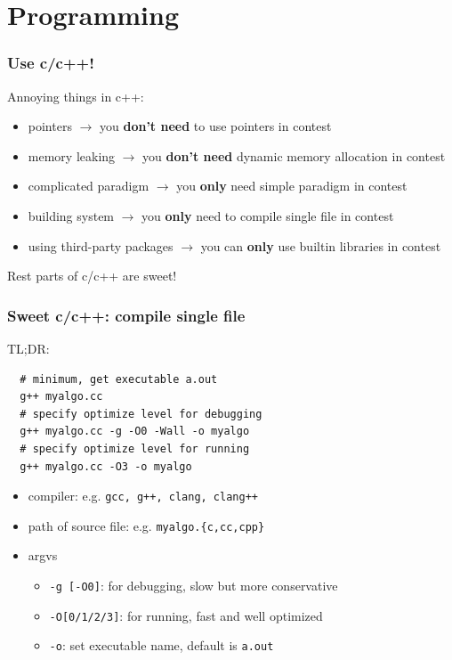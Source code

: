 \documentclass{beamer}
\begin{document}
\section{Programming}
\begin{frame}
  \frametitle{Use c/c++!}

Annoying things in c++:

\begin{itemize}
  \item {
    pointers
     {
      $\rightarrow$ you \textbf{don't need} to use pointers in contest
    }
  }
  \item {
    memory leaking
     {
      $\rightarrow$ you \textbf{don't need} dynamic memory allocation in contest
    }
  }
  \item {
    complicated paradigm
     {
      $\rightarrow$ you \textbf{only} need simple paradigm in contest
    }
  }
  \item {
    building system
     {
      $\rightarrow$ you \textbf{only} need to compile single file in contest
    }
  }
  \item {
    using third-party packages
     {
      $\rightarrow$ you can \textbf{only} use builtin libraries in contest
    }
  }
\end{itemize}
  
 {
  Rest parts of c/c++ are sweet!
}
\end{frame}

\begin{frame}[fragile]
  \frametitle{Sweet c/c++: compile single file}
TL;DR:
\begin{verbatim}
  # minimum, get executable a.out
  g++ myalgo.cc
  # specify optimize level for debugging
  g++ myalgo.cc -g -O0 -Wall -o myalgo
  # specify optimize level for running
  g++ myalgo.cc -O3 -o myalgo
\end{verbatim}
\begin{itemize}
  \item compiler: e.g. \texttt{gcc, g++, clang, clang++}
  \item path of source file: e.g. \texttt{myalgo.\{c,cc,cpp\}}
  \item argvs
    \begin{itemize}
      \item \texttt{-g [-O0]}: for debugging, slow but more conservative
      \item \texttt{-O[0/1/2/3]}: for running, fast and well optimized
      \item \texttt{-o}: set executable name, default is \texttt{a.out}
    \end{itemize}
\end{itemize}

\end{frame}
\end{document}
